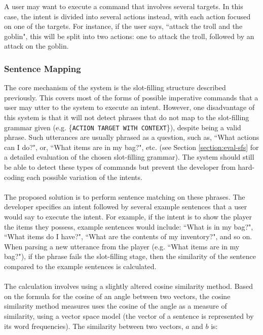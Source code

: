 \documentclass[11pt]{article}
\begin{document}
A user may want to execute a command that involves several targets. In this case, the intent is divided into several actions instead, with each action focused on one of the targets. For instance, if the user says, ``attack the troll and the goblin", this will be split into two actions: one to attack the troll, followed by an attack on the goblin.

\subsubsection{Sentence Mapping}
\label{section:sentence-mapping}

The core mechanism of the system is the slot-filling structure described previously. This covers most of the forms of possible imperative commands that a user may utter to the system to execute an intent. However, one disadvantage of this system is that it will not detect phrases that do not map to the slot-filling grammar given (e.g. \{\texttt{ACTION TARGET WITH CONTEXT}\}), despite being a valid phrase. Such utterances are usually phrased as a question, such as, ``What actions can I do?", or, ``What items are in my bag?", etc. (see Section \ref{section:eval-sfs} for a detailed evaluation of the chosen slot-filling grammar). The system should still be able to detect these types of commands but prevent the developer from hard-coding each possible variation of the intents.
\\
\\
The proposed solution is to perform sentence matching on these phrases. The developer specifies an intent followed by several example sentences that a user would say to execute the intent. For example, if the intent is to show the player the items they possess, example sentences would include: ``What is in my bag?", ``What items do I have?", ``What are the contents of my inventory?", and so on. When parsing a new utterance from the player (e.g. ``What items are in my bag?"), if the phrase fails the slot-filling stage, then the similarity of the sentence compared to the example sentences is calculated.
\\
\\
The calculation involves using a slightly altered cosine similarity method. Based on the formula for the cosine of an angle between two vectors, the cosine  similarity method measures uses the cosine of the angle as a measure of similarity, using a vector space model \cite{RefWorks:119} (the vector of a sentence is represented by its word frequencies). The similarity between two vectors, $a$ and $b$ is:
\end{document}
